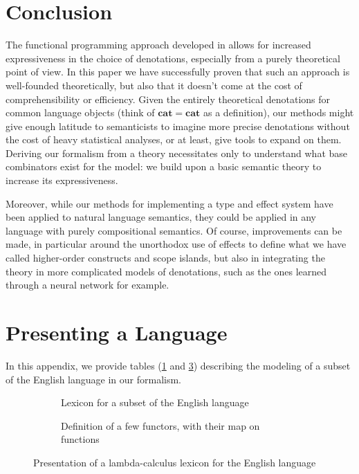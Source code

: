 \documentclass[a4paper,UKenglish,cleveref, autoref, thm-restate, anonymous]{lipics-v2021}
\begin{document}
\section{Conclusion}
The functional programming approach developed in
\cite{bumfordEffectdrivenInterpretationFunctors2025} allows for increased
expressiveness in the choice of denotations, especially from a purely
theoretical point of view.
In this paper we have successfully proven that such an approach is well-founded
theoretically, but also that it doesn't come at the cost of comprehensibility
or efficiency.
Given the entirely theoretical denotations for common language objects (think
of $\mathbf{cat} = \mathbf{cat}$ as a definition), our methods might give
enough latitude to semanticists to imagine more precise denotations without the
cost of heavy statistical analyses, or at least, give tools to expand on them.
Deriving our formalism from a theory necessitates only to understand what base
combinators exist for the model: we build upon a basic semantic theory to
increase its expressiveness.

Moreover, while our methods for implementing a type and effect system have been
applied to natural language semantics, they could be applied in any language
with purely compositional semantics.
Of course, improvements can be made, in particular around the unorthodox use of
effects to define what we have called higher-order constructs and scope
islands, but also in integrating the theory in more complicated models of
denotations, such as the ones learned through a neural network for example.

\appendix


\section{Presenting a Language}
In this appendix, we provide tables (\ref{fig:lexicon} and \ref{fig:functors}) describing the
modeling of a subset of the English language in our formalism.

\begin{figure}[h!]
	\centering
	\begin{subfigure}{.9\textwidth}
		\centering
		
		\caption{Lexicon for a subset of the English language}
		\label{fig:lexicon}
	\end{subfigure}

	\medskip

	\begin{subfigure}{\textwidth}
		\centering
		\resizebox{\textwidth}{!}{%
			
		}
		\caption{Definition of a few functors, with their map on functions}
		\label{fig:functors}
	\end{subfigure}
	\caption{Presentation of a lambda-calculus lexicon for the English language}
\end{figure}
\end{document}
